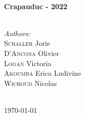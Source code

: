 \documentclass[12pt]{article}
\begin{document}
\begin{titlepage}
\HRule \\[0.4cm]
{ \huge \bfseries Crapauduc - 2022}\\[0.4cm] %
\HRule \\[1.5cm]
 

\begin{minipage}{0.4\textwidth}
\begin{flushleft} \large
\emph{Authors:}\\
\textsc{Schaller} Joris\\ %
\textsc{D'Ancona} Olivier\\ %
\textsc{Logan}  Victoria\\ %
\textsc{Akoumba} Erica Ludivine\\ %
\textsc{Wichoud} Nicolas\\ %

\end{flushleft}

\end{minipage}\\[1.5cm]



{\large \today}\\[2cm] %

\vfill %

\end{titlepage}
\end{document}
